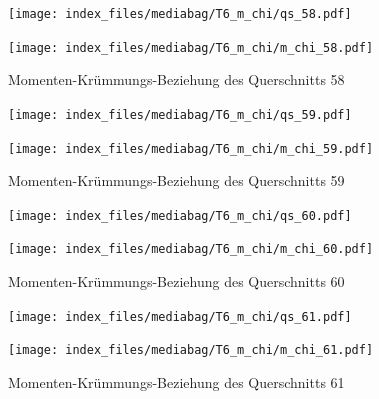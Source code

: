 \documentclass[
  11pt,
  letterpaper,
]{scrreprt}
\begin{document}
\begin{figure}[H]

\begin{minipage}{0.50\linewidth}
\texttt{[image: index\_files/mediabag/T6\_m\_chi/qs\_58.pdf]}\end{minipage}%
%
\begin{minipage}{0.50\linewidth}
\texttt{[image: index\_files/mediabag/T6\_m\_chi/m\_chi\_58.pdf]}\end{minipage}%

\caption{\label{fig-mchi_anhang}Momenten-Krümmungs-Beziehung des
Querschnitts 58}

\end{figure}%

\begin{figure}[H]

\begin{minipage}{0.50\linewidth}
\texttt{[image: index\_files/mediabag/T6\_m\_chi/qs\_59.pdf]}\end{minipage}%
%
\begin{minipage}{0.50\linewidth}
\texttt{[image: index\_files/mediabag/T6\_m\_chi/m\_chi\_59.pdf]}\end{minipage}%

\caption{\label{fig-mchi_anhang}Momenten-Krümmungs-Beziehung des
Querschnitts 59}

\end{figure}%

\begin{figure}[H]

\begin{minipage}{0.50\linewidth}
\texttt{[image: index\_files/mediabag/T6\_m\_chi/qs\_60.pdf]}\end{minipage}%
%
\begin{minipage}{0.50\linewidth}
\texttt{[image: index\_files/mediabag/T6\_m\_chi/m\_chi\_60.pdf]}\end{minipage}%

\caption{\label{fig-mchi_anhang}Momenten-Krümmungs-Beziehung des
Querschnitts 60}

\end{figure}%

\begin{figure}[H]

\begin{minipage}{0.50\linewidth}
\texttt{[image: index\_files/mediabag/T6\_m\_chi/qs\_61.pdf]}\end{minipage}%
%
\begin{minipage}{0.50\linewidth}
\texttt{[image: index\_files/mediabag/T6\_m\_chi/m\_chi\_61.pdf]}\end{minipage}%

\caption{\label{fig-mchi_anhang}Momenten-Krümmungs-Beziehung des
Querschnitts 61}

\end{figure}%
\end{document}
